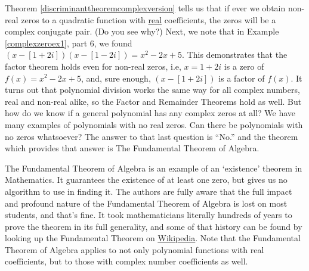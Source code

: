 \pagebreak

Theorem \ref{discriminanttheoremcomplexversion} tells us that if ever we obtain non-real zeros to a quadratic function with \underline{real} coefficients, the zeros  will be a complex conjugate pair. (Do you see why?)  Next, we note that in Example \ref{complexzeroex1}, part 6, we found $(x-[1+2i])(x-[1-2i])=x^2-2x+5$.  This demonstrates that the factor theorem holds even for non-real zeros, i.e,  $x=1+2i$ is a zero of $f(x)=x^2-2x+5$, and, sure enough, $(x-[1+2i])$ is a factor of $f(x)$.  It turns out that polynomial division works the same way for all complex numbers, real and non-real alike, so the Factor and Remainder Theorems hold as well.  But how do we know if a general polynomial has any complex zeros at all?  We have many examples of polynomials with no real zeros.  Can there be polynomials with no zeros whatsoever?  The answer to that last question is ``No.'' and the theorem which provides that answer is  The Fundamental Theorem of Algebra.

\medskip


\medskip

The Fundamental Theorem of Algebra is an example of an `existence' theorem in Mathematics.  It  guarantees the existence of at least one zero, but gives us no algorithm to use in finding it.  The authors are fully aware that the full impact and profound nature of the Fundamental Theorem of Algebra  is lost on most students, and that's fine.  It took mathematicians literally hundreds of years to prove the theorem in its full generality, and some of that history can be found by looking up the Fundamental Theorem on \href{http://en.wikipedia.org/wiki/Fundamental_theorem_of_algebra}{\underline{Wikipedia}}.  Note that the Fundamental Theorem of Algebra  applies to not only polynomial functions with real coefficients, but to those with complex number coefficients as well.  


